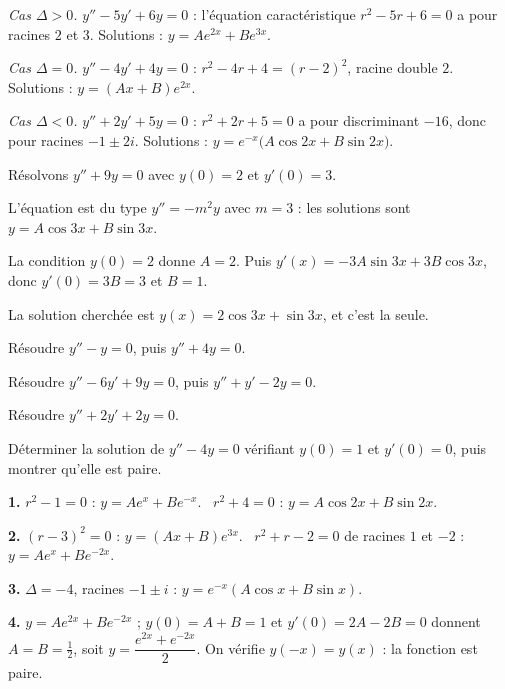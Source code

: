 \begin{exemple}
\emph{Cas $\Delta>0$.} $y''-5y'+6y = 0$ : l'équation caractéristique
$r^{2}-5r+6 = 0$ a pour racines $2$ et $3$. Solutions :
$y = Ae^{2x}+Be^{3x}$.

\smallskip
\emph{Cas $\Delta=0$.} $y''-4y'+4y = 0$ : $r^{2}-4r+4 = (r-2)^{2}$, racine
double $2$. Solutions : $y = (Ax+B)e^{2x}$.

\smallskip
\emph{Cas $\Delta<0$.} $y''+2y'+5y = 0$ : $r^{2}+2r+5 = 0$ a pour discriminant
$-16$, donc pour racines $-1 \pm 2i$. Solutions :
$y = e^{-x}\bigl(A\cos 2x + B\sin 2x\bigr)$.
\end{exemple}

\begin{exemple}
Résolvons $y'' + 9y = 0$ avec $y(0) = 2$ et $y'(0) = 3$.

L'équation est du type $y'' = -m^{2}y$ avec $m = 3$ : les solutions sont
$y = A\cos 3x + B\sin 3x$.

\smallskip
La condition $y(0) = 2$ donne $A = 2$. Puis
$y'(x) = -3A\sin 3x + 3B\cos 3x$, donc $y'(0) = 3B = 3$ et $B = 1$.

\smallskip
La solution cherchée est $y(x) = 2\cos 3x + \sin 3x$, et c'est la seule.
\end{exemple}

\begin{entrainement}
\exo[\niveau{1}] Résoudre $y''-y = 0$, puis $y''+4y = 0$.

\exo[\niveau{2}] Résoudre $y''-6y'+9y = 0$, puis $y''+y'-2y = 0$.

\exo[\niveau{2}] Résoudre $y''+2y'+2y = 0$.

\exo[\niveau{3}] Déterminer la solution de $y''-4y = 0$ vérifiant $y(0) = 1$
et $y'(0) = 0$, puis montrer qu'elle est paire.
\end{entrainement}

\begin{corrige}
\textbf{1.} $r^{2}-1 = 0$ : $y = Ae^{x}+Be^{-x}$. \ $r^{2}+4 = 0$ :
$y = A\cos 2x + B\sin 2x$.

\textbf{2.} $(r-3)^{2} = 0$ : $y = (Ax+B)e^{3x}$. \ $r^{2}+r-2 = 0$ de racines
$1$ et $-2$ : $y = Ae^{x}+Be^{-2x}$.

\textbf{3.} $\Delta = -4$, racines $-1\pm i$ :
$y = e^{-x}(A\cos x + B\sin x)$.

\textbf{4.} $y = Ae^{2x}+Be^{-2x}$ ; $y(0) = A+B = 1$ et
$y'(0) = 2A-2B = 0$ donnent $A = B = \tfrac12$, soit
$y = \dfrac{e^{2x}+e^{-2x}}{2}$. On vérifie $y(-x) = y(x)$ : la fonction est
paire.
\end{corrige}

